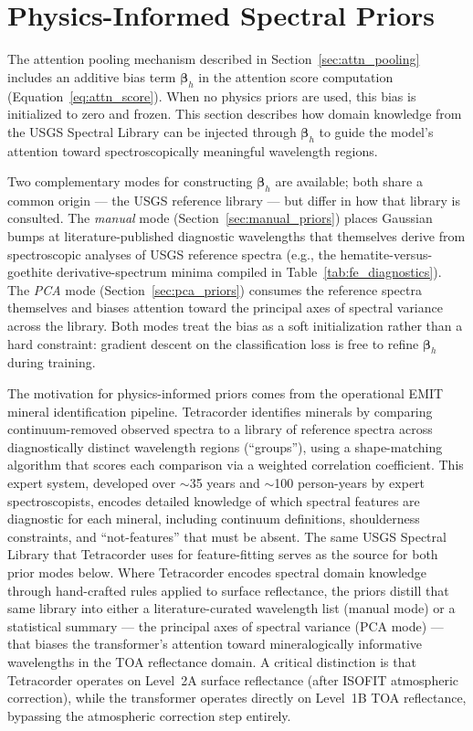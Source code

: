 \documentclass[11pt]{report}
\begin{document}
\section{Physics-Informed Spectral Priors}
\label{chap:physics}

The attention pooling mechanism described in Section~\ref{sec:attn_pooling} includes an additive bias term $\bm{\beta}_h$ in the attention score computation (Equation~\ref{eq:attn_score}). When no physics priors are used, this bias is initialized to zero and frozen. This section describes how domain knowledge from the USGS Spectral Library can be injected through $\bm{\beta}_h$ to guide the model's attention toward spectroscopically meaningful wavelength regions.

Two complementary modes for constructing $\bm{\beta}_h$ are available; both share a common origin --- the USGS reference library --- but differ in how that library is consulted.
The \emph{manual} mode (Section~\ref{sec:manual_priors}) places Gaussian bumps at literature-published diagnostic wavelengths that themselves derive from spectroscopic analyses of USGS reference spectra (e.g., the hematite-versus-goethite derivative-spectrum minima compiled in Table~\ref{tab:fe_diagnostics}).
The \emph{PCA} mode (Section~\ref{sec:pca_priors}) consumes the reference spectra themselves and biases attention toward the principal axes of spectral variance across the library.
Both modes treat the bias as a soft initialization rather than a hard constraint: gradient descent on the classification loss is free to refine $\bm{\beta}_h$ during training.

The motivation for physics-informed priors comes from the operational EMIT mineral identification pipeline. Tetracorder \cite{clark2003tetracorder, clark2024tetracorder} identifies minerals by comparing continuum-removed observed spectra to a library of reference spectra across diagnostically distinct wavelength regions (``groups''), using a shape-matching algorithm that scores each comparison via a weighted correlation coefficient. This expert system, developed over $\sim$35 years and $\sim$100 person-years by expert spectroscopists, encodes detailed knowledge of which spectral features are diagnostic for each mineral, including continuum definitions, shoulderness constraints, and ``not-features'' that must be absent. The same USGS Spectral Library \cite{kokaly2017usgs} that Tetracorder uses for feature-fitting serves as the source for both prior modes below. Where Tetracorder encodes spectral domain knowledge through hand-crafted rules applied to surface reflectance, the priors distill that same library into either a literature-curated wavelength list (manual mode) or a statistical summary --- the principal axes of spectral variance (PCA mode) --- that biases the transformer's attention toward mineralogically informative wavelengths in the TOA reflectance domain. A critical distinction is that Tetracorder operates on Level~2A surface reflectance (after ISOFIT atmospheric correction), while the transformer operates directly on Level~1B TOA reflectance, bypassing the atmospheric correction step entirely.
\end{document}
